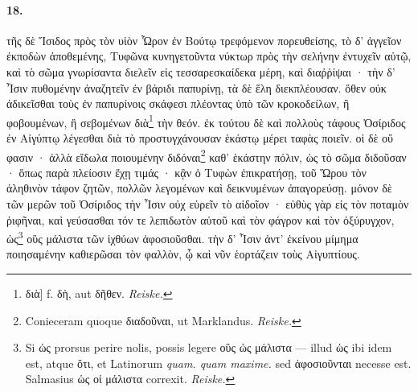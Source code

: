 \documentclass[a4paper, 11pt, oneside, polutonikogreek, german]{article}
\begin{document}
\paragraph{18.}
τῆς δὲ Ἴσιδος πρὸς τὸν υἱὸν Ὧρον ἐν Βούτῳ τρεφόμενον πορευθείσης, τὸ δ' ἀγγεῖον ἐκποδὼν ἀποθεμένης, Τυφῶνα κυνηγετοῦντα νύκτωρ πρὸς τὴν σελήνην ἐντυχεῖν αὐτῷ, καὶ τὸ σῶμα γνωρίσαντα διελεῖν εἰς τεσσαρεσκαίδεκα μέρη, καὶ διαῤῥίψαι · τὴν δ' Ἶσιν πυθομένην ἀναζητεῖν ἐν βάριδι παπυρίνῃ, τὰ δὲ ἕλη διεκπλέουσαν. ὅθεν οὐκ ἀδικεῖσθαι τοὺς ἐν παπυρίνοις σκάφεσι πλέοντας ὑπὸ τῶν κροκοδείλων, ἢ φοβουμένων, ἢ σεβομένων διὰ\footnote{διὰ] f. δὴ, aut δῆθεν. \emph{Reiske.}} τὴν θεόν. ἐκ τούτου δὲ καὶ πολλοὺς τάφους Ὀσίριδος ἐν Αἰγύπτῳ λέγεσθαι διὰ τὸ προστυγχάνουσαν ἑκάστῳ μέρει ταφὰς ποιεῖν. οἱ δὲ οὔ φασιν · ἀλλὰ εἴδωλα ποιουμένην διδόναι\footnote{Conieceram quoque διαδοῦναι, ut Marklandus. \emph{Reiske.}} καθ' ἑκάστην πόλιν, ὡς τὸ σῶμα διδοῦσαν · ὅπως παρὰ πλείοσιν ἔχῃ τιμάς · κᾂν ὁ Τυφὼν ἐπικρατήσῃ, τοῦ Ὥρου τὸν ἀληθινὸν τάφον ζητῶν, πολλῶν λεγομένων καὶ δεικνυμένων ἀπαγορεύσῃ. μόνον δὲ τῶν μερῶν τοῦ Ὀσίριδος τὴν Ἶσιν οὐχ εὑρεῖν τὸ αἰδοῖον · εὐθὺς γὰρ εἰς τὸν ποταμὸν ῥιφῆναι, καὶ γεύσασθαι τόν τε λεπιδωτὸν αὐτοῦ καὶ τὸν φάγρον καὶ τὸν ὀξύρυγχον, ὡς\footnote{Si ὡς prorsus perire nolis, possis legere οὓς ὡς μάλιστα --- illud ὡς ibi idem est, atque ὅτι, et Latinorum \emph{quam. quam maxime.} sed ἀφοσιοῦνται necesse est. Salmasius ὡς οἱ μάλιστα correxit. \emph{Reiske.}} οὓς μάλιστα τῶν ἰχθύων ἀφοσιοῦσθαι. τὴν δ' Ἶσιν ἀντ' ἐκείνου μίμημα ποιησαμένην καθιερῶσαι τὸν φαλλὸν, ᾧ καὶ νῦν ἑορτάζειν τοὺς Αἰγυπτίους.
\end{document}
